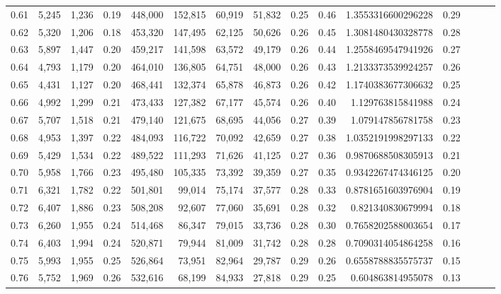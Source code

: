 \begin{tabular}{rrrrrrrrrrrrrrr}
0.61 &   5,245 &  1,236 &  0.19 &  448,000 &  152,815 &   60,919 &   51,832 &  0.25 &  0.46 &    1.3553316600296228 &      0.29 \\
0.62 &   5,320 &  1,206 &  0.18 &  453,320 &  147,495 &   62,125 &   50,626 &  0.26 &  0.45 &    1.3081480430328778 &      0.28 \\
0.63 &   5,897 &  1,447 &  0.20 &  459,217 &  141,598 &   63,572 &   49,179 &  0.26 &  0.44 &    1.2558469547941926 &      0.27 \\
0.64 &   4,793 &  1,179 &  0.20 &  464,010 &  136,805 &   64,751 &   48,000 &  0.26 &  0.43 &    1.2133373539924257 &      0.26 \\
0.65 &   4,431 &  1,127 &  0.20 &  468,441 &  132,374 &   65,878 &   46,873 &  0.26 &  0.42 &    1.1740383677306632 &      0.25 \\
0.66 &   4,992 &  1,299 &  0.21 &  473,433 &  127,382 &   67,177 &   45,574 &  0.26 &  0.40 &     1.129763815841988 &      0.24 \\
0.67 &   5,707 &  1,518 &  0.21 &  479,140 &  121,675 &   68,695 &   44,056 &  0.27 &  0.39 &     1.079147856781758 &      0.23 \\
0.68 &   4,953 &  1,397 &  0.22 &  484,093 &  116,722 &   70,092 &   42,659 &  0.27 &  0.38 &    1.0352191998297133 &      0.22 \\
0.69 &   5,429 &  1,534 &  0.22 &  489,522 &  111,293 &   71,626 &   41,125 &  0.27 &  0.36 &    0.9870688508305913 &      0.21 \\
0.70 &   5,958 &  1,766 &  0.23 &  495,480 &  105,335 &   73,392 &   39,359 &  0.27 &  0.35 &    0.9342267474346125 &      0.20 \\
0.71 &   6,321 &  1,782 &  0.22 &  501,801 &   99,014 &   75,174 &   37,577 &  0.28 &  0.33 &    0.8781651603976904 &      0.19 \\
0.72 &   6,407 &  1,886 &  0.23 &  508,208 &   92,607 &   77,060 &   35,691 &  0.28 &  0.32 &     0.821340830679994 &      0.18 \\
0.73 &   6,260 &  1,955 &  0.24 &  514,468 &   86,347 &   79,015 &   33,736 &  0.28 &  0.30 &    0.7658202588003654 &      0.17 \\
0.74 &   6,403 &  1,994 &  0.24 &  520,871 &   79,944 &   81,009 &   31,742 &  0.28 &  0.28 &    0.7090314054864258 &      0.16 \\
0.75 &   5,993 &  1,955 &  0.25 &  526,864 &   73,951 &   82,964 &   29,787 &  0.29 &  0.26 &    0.6558788835575737 &      0.15 \\
0.76 &   5,752 &  1,969 &  0.26 &  532,616 &   68,199 &   84,933 &   27,818 &  0.29 &  0.25 &     0.604863814955078 &      0.13 \\

\end{tabular}
